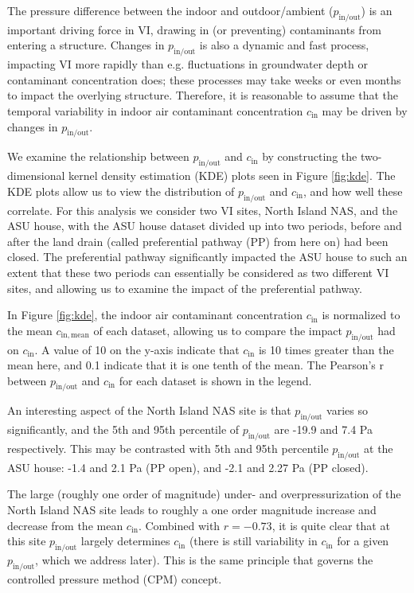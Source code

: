 \documentclass[journal=esthag,manuscript=article]{achemso}
\begin{document}
The pressure difference between the indoor and outdoor/ambient ($p_\mathrm{in/out}$) is an important driving force in VI, drawing in (or preventing) contaminants from entering a structure. %
Changes in $p_\mathrm{in/out}$ is also a dynamic and fast process, impacting VI more rapidly than e.g. fluctuations in groundwater depth or contaminant concentration does; these processes may take weeks or even months to impact the overlying structure.
Therefore, it is reasonable to assume that the temporal variability in indoor air contaminant concentration $c_\mathrm{in}$ may be driven by changes in $p_\mathrm{in/out}$.

We examine the relationship between $p_\mathrm{in/out}$ and $c_\mathrm{in}$ by constructing the two-dimensional kernel density estimation (KDE) plots seen in Figure \ref{fig:kde}.
The KDE plots allow us to view the distribution of $p_\mathrm{in/out}$ and $c_\mathrm{in}$, and how well these correlate.
For this analysis we consider two VI sites, North Island NAS, and the ASU house, with the ASU house dataset divided up into two periods, before and after the land drain (called preferential pathway (PP) from here on) had been closed.
The preferential pathway significantly impacted the ASU house to such an extent that these two periods can essentially be considered as two different VI sites, and allowing us to examine the impact of the preferential pathway.

In Figure \ref{fig:kde}, the indoor air contaminant concentration $c_\mathrm{in}$ is normalized to the mean $c_\mathrm{in,mean}$ of each dataset, allowing us to compare the impact $p_\mathrm{in/out}$ had on $c_\mathrm{in}$.
A value of 10 on the y-axis indicate that $c_\mathrm{in}$ is 10 times greater than the mean here, and 0.1 indicate that it is one tenth of the mean.
The Pearson's r between $p_\mathrm{in/out}$ and $c_\mathrm{in}$ for each dataset is shown in the legend.

An interesting aspect of the North Island NAS site is that $p_\mathrm{in/out}$ varies so significantly, and the 5th and 95th percentile of $p_\mathrm{in/out}$ are -19.9 and 7.4 Pa respectively.
This may be contrasted with 5th and 95th percentile $p_\mathrm{in/out}$ at the ASU house: -1.4 and 2.1 Pa (PP open), and -2.1 and 2.27 Pa (PP closed).

The large (roughly one order of magnitude) under- and overpressurization of the North Island NAS site leads to roughly a one order magnitude increase and decrease from the mean $c_\mathrm{in}$.
Combined with $r=-0.73$, it is quite clear that at this site $p_\mathrm{in/out}$ largely determines $c_\mathrm{in}$ (there is still variability in $c_\mathrm{in}$ for a given $p_\mathrm{in/out}$, which we address later).
This is the same principle that governs the controlled pressure method (CPM) concept.
\end{document}
